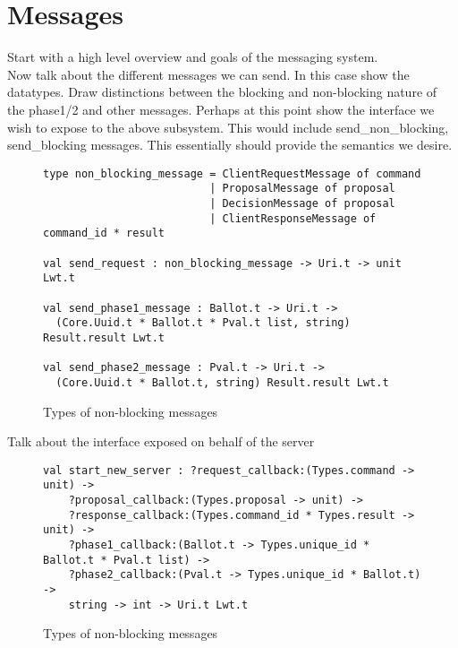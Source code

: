 \section{Messages}

Start with a high level overview and goals of the messaging system. \\

Now talk about the different messages we can send. In this case show the datatypes. Draw distinctions between the blocking and non-blocking nature of the phase1/2 and other messages. Perhaps at this point show the interface we wish to expose to the above subsystem. This would include send\_non\_blocking, send\_blocking messages. This essentially should provide the semantics we desire. \\

\begin{figure}
  \begin{lstlisting}
type non_blocking_message = ClientRequestMessage of command
                          | ProposalMessage of proposal
                          | DecisionMessage of proposal
                          | ClientResponseMessage of command_id * result
                          
val send_request : non_blocking_message -> Uri.t -> unit Lwt.t

val send_phase1_message : Ballot.t -> Uri.t -> 
  (Core.Uuid.t * Ballot.t * Pval.t list, string) Result.result Lwt.t
    
val send_phase2_message : Pval.t -> Uri.t -> 
  (Core.Uuid.t * Ballot.t, string) Result.result Lwt.t
  \end{lstlisting}
  \centering
  \caption{Types of non-blocking messages}
\end{figure}

Talk about the interface exposed on behalf of the server

\begin{figure}
  \begin{lstlisting}
val start_new_server : ?request_callback:(Types.command -> unit) ->
    ?proposal_callback:(Types.proposal -> unit) ->
    ?response_callback:(Types.command_id * Types.result -> unit) ->
    ?phase1_callback:(Ballot.t -> Types.unique_id * Ballot.t * Pval.t list) ->
    ?phase2_callback:(Pval.t -> Types.unique_id * Ballot.t) ->
    string -> int -> Uri.t Lwt.t  
  \end{lstlisting}
  \centering
  \caption{Types of non-blocking messages}
\end{figure}

